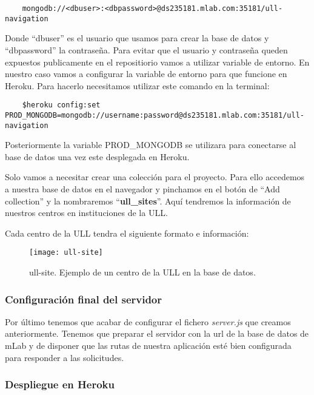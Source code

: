 \begin{lstlisting}
    mongodb://<dbuser>:<dbpassword>@ds235181.mlab.com:35181/ull-navigation
\end{lstlisting}

Donde ``dbuser'' es el usuario que usamos para crear la base de datos y ``dbpassword'' la contraseña. Para evitar que el usuario y contraseña queden expuestos publicamente en el repositiorio vamos a utilizar variable de entorno. En nuestro caso vamos a configurar la variable de entorno para que funcione en Heroku. Para hacerlo necesitamos utilizar este comando en la terminal:

\begin{lstlisting}
    $heroku config:set PROD_MONGODB=mongodb://username:password@ds235181.mlab.com:35181/ull-navigation
\end{lstlisting}

Posteriormente la variable PROD\_MONGODB se utilizara para conectarse al base de datos una vez este desplegada en Heroku.

Solo vamos a necesitar crear una colección para el proyecto. Para ello accedemos a nuestra base de datos en el navegador y pinchamos en el botón de ``Add collection'' y la nombraremos ``\textbf{ull\_sites}''. Aquí tendremos la información de nuestros centros en instituciones de la ULL. 

Cada centro de la ULL tendra el siguiente formato e información:

\begin{figure}[h] 
	\centering
	\texttt{[image: ull-site]}
	\caption{ull-site. Ejemplo de un centro de la ULL en la base de datos.}
	\label{fig:ull-site}
\end{figure}

\subsubsection{Configuración final del servidor}

Por último tenemos que acabar de configurar el fichero \textit{server.js} que creamos anteriormente. Tenemos que preparar el servidor con la url de la base de datos de mLab y de disponer que las rutas de nuestra aplicación esté bien configurada para responder a las solicitudes. 



\subsubsection{Despliegue en Heroku}

